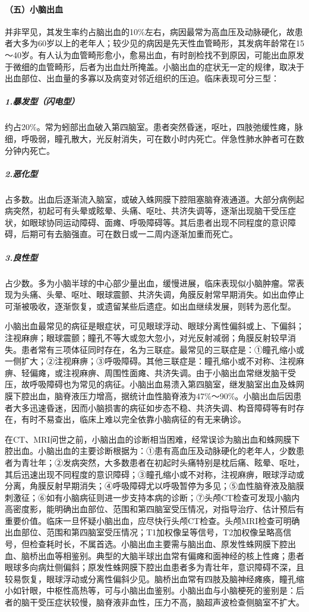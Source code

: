 \paragraph{（五）小脑出血}

并非罕见，其发生率约占脑出血的10\%左右，病因最常为高血压及动脉硬化，故患者大多为60岁以上的老年人；较少见的病因是先天性血管畸形，其发病年龄常在15～40岁。有人认为血管畸形愈小，愈易出血，有时剖检找不到原因，可能出血原发于微细的血管畸形，后者为出血灶所掩盖。小脑出血的症状无一定的规律，取决于出血部位、出血量的多寡以及病变对邻近组织的压迫。临床表现可分三型：

\subparagraph{1.暴发型（闪电型）}

约占20\%。常为蚓部出血破入第四脑室。患者突然昏迷，呕吐，四肢弛缓性瘫，脉细，呼吸弱，瞳孔散大，光反射消失，可在数小时内死亡。伴急性肺水肿者可在数分钟内死亡。

\subparagraph{2.恶化型}

占多数。出血后逐渐流入脑室，或破入蛛网膜下腔阻塞脑脊液通道。大部分病例起病突然，初起可有头晕或眩晕、头痛、呕吐、共济失调等，逐渐出现脑干受压症状，如眼球协同运动障碍、面瘫、呼吸障碍等。其后患者出现不同程度的意识障碍，后期可有去脑强直。可在数日或一二周内逐渐加重而死亡。

\subparagraph{3.良性型}

占少数。多为小脑半球的中心部少量出血，缓慢进展，临床表现似小脑肿瘤。常表现为头痛、头晕、呕吐、眼球震颤、共济失调，角膜反射常早期消失。如出血停止可渐被吸收，逐渐恢复，或遗留某些后遗症。如出血继续发展，则转为恶化型。

小脑出血最常见的病征是眼症状，可见眼球浮动、眼球分离性偏斜或上、下偏斜；注视麻痹；眼球震颤；瞳孔不等大或忽大忽小，对光反射减弱；角膜反射较早消失。患者常有三项体征同时存在，名为三联症。最常见的三联症是：①瞳孔缩小或一侧扩大；②注视麻痹；③呼吸障碍。其他三联症是：瞳孔缩小或不对称、注视麻痹、轻偏瘫，或注视麻痹、周围性面瘫、共济失调。由于小脑出血常继发脑干受压，故呼吸障碍也为常见的病征。小脑出血易溃入第四脑室，继发脑室出血及蛛网膜下腔出血，脑脊液压力增高，据统计血性脑脊液为47\%～90\%。小脑出血后因患者大多迅速昏迷，因而小脑损害的病征如步态不稳、共济失调、构音障碍等有时存在，有时不易查出，临床上难以完全依靠小脑病征的有无来确诊。

在CT、MRI问世之前，小脑出血的诊断相当困难，经常误诊为脑出血和蛛网膜下腔出血。小脑出血的主要诊断根据为：①患有高血压及动脉硬化的老年人，少数患者为青壮年；②发病突然，大多数患者在初起时头痛特别是枕后痛、眩晕、呕吐，其后迅速出现不同程度的意识障碍；③瞳孔缩小或不对称，注视麻痹，眼球浮动或分离，角膜反射早期消失；④呼吸障碍尤以呼吸暂停为多见；⑤血性脑脊液及脑膜刺激征；⑥如有小脑病征则进一步支持本病的诊断；⑦头颅CT检查可发现小脑内高密度影，能明确出血部位、范围和第四脑室受压情况，对指导治疗、估计预后有重要价值。临床一旦怀疑小脑出血，应尽快行头颅CT检查。头颅MRI检查可明确出血部位、范围和第四脑室受压情况；T1加权像呈等信号，T2加权像呈略高信号，但检查耗时长，不属首选。小脑出血主要需与脑出血、原发性蛛网膜下腔出血、脑桥出血等相鉴别。典型的大脑半球出血常有偏瘫和面神经的核上性瘫；患者眼球多向病灶侧偏斜；原发性蛛网膜下腔出血患者多为青壮年，意识障碍不深，且较易恢复，眼球浮动或分离性偏斜少见。脑桥出血常有四肢及脑神经瘫痪，瞳孔缩小如针眼，中枢性高热等，可与小脑出血鉴别。小脑出血与小脑梗死的鉴别是：后者的脑干受压症状较慢，脑脊液非血性，压力不高，脑超声波检查侧脑室不扩大。

